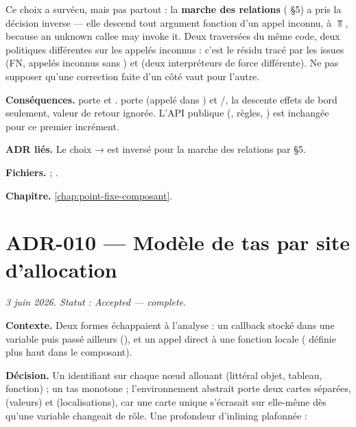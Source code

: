\begin{piege}
Ce choix a survécu, mais pas partout : la \textbf{marche des relations}
( §5) a pris la décision inverse --- elle descend tout argument
fonction d'un appel inconnu, à $\Top$, \og because an unknown callee may
invoke it\fg{}. Deux traversées du même code, deux politiques différentes sur
les appelés inconnus : c'est le résidu tracé par les issues  (FN,
appelés inconnus sans ) et  (deux interpréteurs de force
différente). Ne pas supposer qu'une correction faite d'un côté vaut pour
l'autre.
\end{piege}

\textbf{Conséquences.}  porte
 et . 
porte  (appelé dans ) et
/, la descente \og effets de bord
seulement, valeur de retour ignorée\fg{}. L'API publique (,
règles, ) est inchangée pour ce premier incrément.

\textbf{ADR liés.} Le choix  →  est inversé pour la
marche des relations par  §5.

\textbf{Fichiers.}  ; .

\textbf{Chapitre.} \cref{chap:point-fixe-composant}.

\section{ADR-010 --- Modèle de tas par site d'allocation}
\label{adr:10}
\noindent\textit{3 juin 2026. Statut : Accepted --- complete.}

\textbf{Contexte.} Deux formes échappaient à l'analyse : un callback stocké
dans une variable puis passé ailleurs (),
et un appel direct à une fonction locale ( définie plus haut dans
le composant).

\textbf{Décision.} Un identifiant  sur chaque nœud allouant
(littéral objet, tableau, fonction) ; un tas 
monotone ; l'environnement abstrait porte deux cartes séparées,
 (valeurs) et  (localisations), car une carte unique
 s'écrasait sur elle-même dès qu'une variable changeait de
rôle. Une profondeur d'inlining plafonnée :

